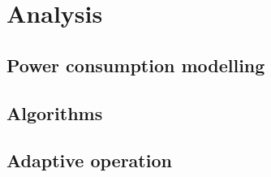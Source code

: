 \chapter{Analysis} \label{Chapter:Analysis}

\section{Power consumption modelling}

\section{Algorithms}

\section{Adaptive operation}
